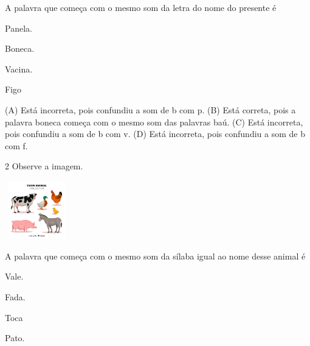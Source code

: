 
A palavra que começa com o mesmo som da letra do nome do presente é

\begin{minipage}{.5\textwidth}
\begin{escolha}
\item Panela.

\item Boneca.

\item Vacina.

\item Figo
\end{escolha}
\end{minipage}

(A) Está incorreta, pois confundiu a som de b com p.
(B) Está correta, pois a palavra boneca começa com o mesmo som das palavras baú.
(C) Está incorreta, pois confundiu a som de b com v.
(D) Está incorreta, pois confundiu a som de b com f.

\num{2} Observe a imagem.

\includegraphics[width=1.10000in,height=0.99236in]{media/image148.jpeg}


A palavra que começa com o mesmo som da sílaba igual ao nome desse animal é

\begin{minipage}{.5\textwidth}
\begin{escolha}
\item Vale.

\item Fada.

\item Toca

\item Pato.
\end{escolha}
\end{minipage}

